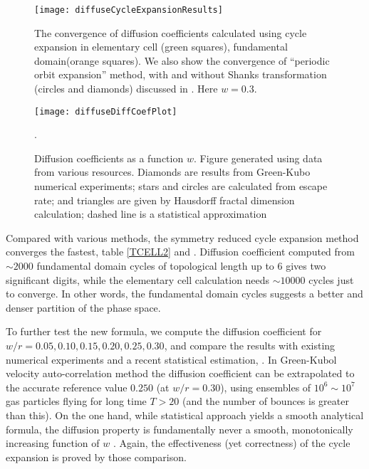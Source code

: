 \documentclass[aps,pre,
                showpacs,
                twocolumn,
                groupedaddress,
                floatfix]{revtex4-1}
\begin{document}
\begin{figure}[htbp]
  \texttt{[image: diffuseCycleExpansionResults]}
  \caption[]{\label{fig-convergence} The convergence of diffusion coefficients  calculated using cycle expansion in elementary cell (green squares),  fundamental domain(orange squares). We  also show the convergence of ``periodic orbit expansion'' method, with and  without Shanks transformation (circles and diamonds) discussed in  . Here $w = 0.3$.  }
\end{figure}

\begin{figure}
\texttt{[image: diffuseDiffCoefPlot]}
  \caption[]{\label{fig-results} Diffusion coefficients as a function $w$.  Figure generated using data from various resources. Diamonds are results from  Green-Kubo numerical experiments; stars and  circles are calculated from escape rate; and triangles are  given by Hausdorff fractal dimension calculation; dashed line  is a statistical approximation}.
\end{figure}

Compared with various methods, the symmetry reduced cycle expansion method converges the fastest, table \ref{TCELL2} and . Diffusion coefficient computed from $\sim2000$ fundamental domain cycles of topological length up to 6 gives two significant digits, while the elementary cell calculation needs $\sim 10000$ cycles just to converge. In other words, the fundamental domain cycles suggests a better and denser partition of the phase space.

To further test the new formula, we compute the diffusion coefficient for $w/r = 0.05, 0.10, 0.15, 0.20, 0.25, 0.30$, and compare the results with existing numerical experiments and a recent statistical estimation, . In Green-Kubol velocity auto-correlation method the  diffusion coefficient can be extrapolated to the accurate reference value $0.250$ (at $w/r=0.30$), using ensembles of $10^6\sim10^7$ gas particles flying for long time $T>20$ (and the number of bounces is greater than this). On the one hand, while statistical approach yields a smooth analytical formula, the diffusion property is fundamentally never a smooth, monotonically increasing function of $w$ 
. Again, the effectiveness (yet correctness) of the cycle expansion is proved by those comparison.
\end{document}
